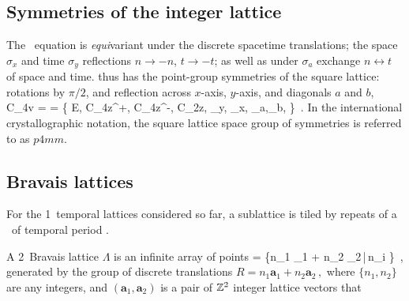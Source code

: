 \subsection{Symmetries of the integer lattice}
\label{s:lattSymm}

The \catlatt\ equation  is \emph{equi}variant under
the discrete spacetime translations;
the space $\sigma_{x}$ and time $\sigma_{y}$ reflections $n\to -n$,
$t\to-t$;
as well as under $\sigma_{a}$ exchange $n\longleftrightarrow t$ of space
and time.
{\catLatt} thus has the point-group symmetries of the square lattice:
rotations by $\pi/2$, and reflection across $x$-axis, $y$-axis, and
diagonals $a$ and $b$,
\beq
C_{4v} =  = \{
E, C_{4z}^+, C_{4z}^-, C_{2z},
\sigma_{y}, \sigma_{x},
\sigma_{a},\sigma_{b},
\}
\,.
In the international crystallographic notation, the square lattice space
group of symmetries is referred to as $p4mm$.



\subsection{Bravais lattices}
\label{s:BravaisLatt}

For the 1\dmn\ temporal lattices considered so far,
a sublattice is tiled by repeats of a \brick\ of temporal period \period{}.



A 2\dmn\ {Bravais lattice} $\Lambda$ is an infinite array of points
\beq
\Lambda = \{n_1 _1 + n_2 _2\,|\,n_i \in {}\}
\,,
generated by the group of discrete translations
\(
{R} =n_{1}\mathbf{a}_{1}+n_{2}\mathbf{a}_{2}
\,,
\)
where $\{n_{1},n_{2}\}$ are any integers, and
$(\mathbf{a}_{1},\mathbf{a}_{2})$ is a pair of $\mathbb{Z}^2$ integer
lattice vectors that

